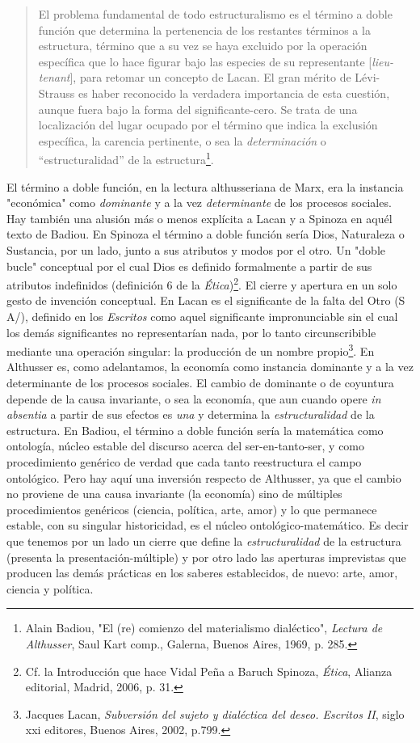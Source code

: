\begin{quote}
El problema fundamental de todo estructuralismo es el término a doble
función que determina la pertenencia de los restantes términos a la
estructura, término que a su vez se haya excluido por la operación
específica que lo hace figurar bajo las especies de su representante
{[}\emph{lieu-tenant}{]}, para retomar un concepto de Lacan. El gran
mérito de Lévi-Strauss es haber reconocido la verdadera importancia de
esta cuestión, aunque fuera bajo la forma del significante-cero. Se
trata de una localización del lugar ocupado por el término que indica la
exclusión específica, la carencia pertinente, o sea la
\emph{determinación} o ``estructuralidad'' de la estructura\footnote{Alain
  Badiou, "El (re) comienzo del materialismo dialéctico", \emph{Lectura
  de Althusser}, Saul Kart comp., Galerna, Buenos Aires, 1969, p. 285.}.
\end{quote}

El término a doble función, en la lectura althusseriana de Marx, era la
instancia "económica" como \emph{dominante} y a la vez
\emph{determinante} de los procesos sociales. Hay también una alusión
más o menos explícita a Lacan y a Spinoza en aquél texto de Badiou. En
Spinoza el término a doble función sería Dios, Naturaleza o Sustancia,
por un lado, junto a sus atributos y modos por el otro. Un "doble bucle"
conceptual por el cual Dios es definido formalmente a partir de sus
atributos indefinidos (definición 6 de la \emph{Ética})\footnote{Cf. la
  Introducción que hace Vidal Peña a Baruch Spinoza, \emph{Ética},
  Alianza editorial, Madrid, 2006, p. 31.}. El cierre y apertura en un
solo gesto de invención conceptual. En Lacan es el significante de la
falta del Otro (S A/), definido en los \emph{Escritos} como aquel
significante impronunciable sin el cual los demás significantes no
representarían nada, por lo tanto circunscribible mediante una operación
singular: la producción de un nombre propio\footnote{Jacques Lacan,
  \emph{Subversión del sujeto y dialéctica del deseo. Escritos II},
  siglo xxi editores, Buenos Aires, 2002, p.799.}. En Althusser es, como
adelantamos, la economía como instancia dominante y a la vez
determinante de los procesos sociales. El cambio de dominante o de
coyuntura depende de la causa invariante, o sea la economía, que aun
cuando opere \emph{in absentia} a partir de sus efectos es \emph{una} y
determina la \emph{estructuralidad} de la estructura. En Badiou, el
término a doble función sería la matemática como ontología, núcleo
estable del discurso acerca del ser-en-tanto-ser, y como procedimiento
genérico de verdad que cada tanto reestructura el campo ontológico. Pero
hay aquí una inversión respecto de Althusser, ya que el cambio no
proviene de una causa invariante (la economía) sino de múltiples
procedimientos genéricos (ciencia, política, arte, amor) y lo que
permanece estable, con su singular historicidad, es el núcleo
ontológico-matemático. Es decir que tenemos por un lado un cierre que
define la \emph{estructuralidad} de la estructura (presenta la
presentación-múltiple) y por otro lado las aperturas imprevistas que
producen las demás prácticas en los saberes establecidos, de nuevo:
arte, amor, ciencia y política.

